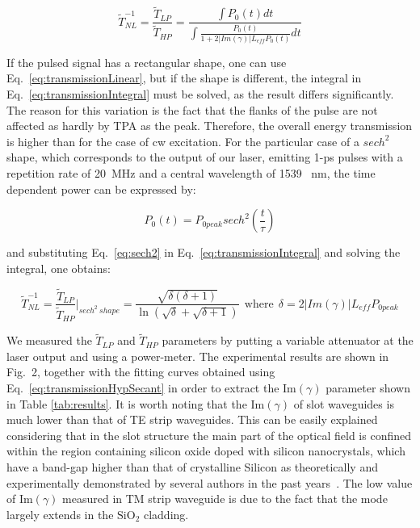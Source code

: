 \documentclass[10pt,letterpaper]{article}
\begin{document}
                                                                \begin{equation}
                                                                        \tilde{T}_{NL}^{-1} = \frac{\tilde{T}_{LP}}{\tilde{T}_{HP}} = \frac{\int P_0(t)dt}{\int \frac{P_0(t)}{1+2|Im(\gamma)| L_{eff} P_0(t)} dt}
                                                                        \label{eq:transmissionIntegral}
                                                                \end{equation}

If the pulsed signal has a rectangular shape, one can use Eq.~\ref{eq:transmissionLinear}, but if the shape is different, the integral in Eq.~\ref{eq:transmissionIntegral} must be solved, as the result differs significantly. The reason for this variation is the fact that the flanks of the pulse are not affected as hardly by TPA as the peak. Therefore, the overall energy transmission is higher than for the case of cw excitation. For the particular case of a $sech^2$ shape, which corresponds to the output of our laser, emitting 1-ps pulses with a repetition rate of 20~MHz and a central wavelength of 1539~ nm, the time dependent power can be expressed by:

\begin{equation}
P_0(t)=P_{0 peak} sech^2 \left(\frac{t}{\tau}\right)
\label{eq:sech2}
\end{equation}

and substituting Eq.~\ref{eq:sech2} in Eq.~\ref{eq:transmissionIntegral} and solving the integral, one obtains:

                                                                \begin{equation}
                                                                        \tilde{T}_{NL}^{-1}  = \frac{\tilde{T}_{LP}}{\tilde{T}_{HP}} \bigg|_{sech^2~shape}  = \frac{\sqrt{\delta({\delta + 1})}}{\ln(\sqrt{\delta}+\sqrt{\delta+1})} ~~\mathrm{where}~~  \delta = 2|Im(\gamma)| L_{eff} P_{0 peak}
                                                                        \label{eq:transmissionHypSecant}
                                                                \end{equation}


We measured the $\tilde{T}_{LP}$ and $\tilde{T}_{HP}$ parameters by putting a variable attenuator at the laser output and using a power-meter. The experimental results are shown in Fig.~2, together with the fitting curves obtained using Eq.~\ref{eq:transmissionHypSecant} in order to extract the Im$(\gamma)$ parameter shown in Table \ref{tab:results}. 
It is worth noting that the Im$(\gamma )$ of slot waveguides is much lower than that of TE strip waveguides.
This can be easily explained considering that in the slot structure the main part of the optical field is confined within the region containing silicon oxide doped with silicon nanocrystals, which have a band-gap higher than that of crystalline Silicon as theoretically and experimentally demonstrated by several authors in the past years~\cite{Buuren98, Bassani, Daldosso2009}. The low value of Im$(\gamma)$ measured in TM strip waveguide is due to the fact that the mode largely extends in the $\mathrm{SiO_2}$ cladding.
\end{document}
